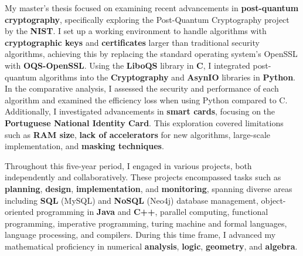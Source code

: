 \documentclass[9pt,a4paper]{altacv}
\begin{document}
\begin{fullwidth}
My master's thesis focused on examining recent advancements in \textbf{post-quantum cryptography}, specifically exploring the Post-Quantum Cryptography project by the \textbf{NIST}. I set up a working environment to handle algorithms with \textbf{cryptographic keys} and \textbf{certificates} larger than traditional security algorithms, achieving this by replacing the standard operating system's OpenSSL with \textbf{OQS-OpenSSL}. Using the \textbf{LiboQS} library in \textbf{C}, I integrated post-quantum algorithms into the \textbf{Cryptography} and \textbf{AsynIO} libraries in \textbf{Python}. In the comparative analysis, I assessed the security and performance of each algorithm and examined the efficiency loss when using Python compared to C. Additionally, I investigated advancements in \textbf{smart cards}, focusing on the \textbf{Portuguese National Identity Card}. This exploration covered limitations such as \textbf{RAM size}, \textbf{lack of accelerators} for new algorithms, large-scale implementation, and \textbf{masking techniques}.



\divider


Throughout this five-year period, I engaged in various projects, both independently and collaboratively. These projects encompassed tasks such as \textbf{planning}, \textbf{design}, \textbf{implementation}, and \textbf{monitoring}, spanning diverse areas including \textbf{SQL} (MySQL) and \textbf{NoSQL} (Neo4j) database management, object-oriented programming in \textbf{Java} and \textbf{C++}, parallel computing, functional programming, imperative programming, turing machine and formal languages, language processing, and compilers. During this time frame, I advanced my mathematical proficiency in numerical \textbf{analysis}, \textbf{logic}, \textbf{geometry}, and \textbf{algebra}.


\end{fullwidth}
\end{document}
